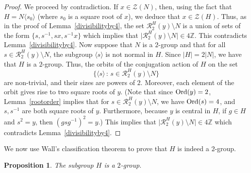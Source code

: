 \documentclass[12pt]{amsart}
\numberwithin{equation}{section}
\newcommand{\Ord}{{\rm Ord}}
\newcommand{\Z}{\mathbb Z}
\newtheorem{prop}[X]{Proposition}
\theoremstyle{definition}
\theoremstyle{remark}
\begin{document}
\begin{proof}
    We proceed by contradiction. If $x\in \mathcal{Z}(N)$, then, using the fact that $H=N\langle s_0\rangle$ (where $s_0$ is a square root of $x$), we deduce that $x\in \mathcal{Z}(H)$. Thus, as in the proof of Lemma~\ref{divisibilityby4}, the set $\mathcal{R}_2^H(y)\setminus N$ is a union of sets of the form $\{s,s^{-1},sx,s^{-1}x\}$ which implies that $\bigl| \mathcal{R}_2^H(y) \setminus N\bigr|\in4\Z$. This contradicts Lemma~\ref{divisibilityby4}. Now suppose that $N$ is a $2$-group and that for all $s\in \mathcal{R}_2^H(y) \setminus N$, the subgroup $\langle s \rangle$ is not normal in $H$. Since $|H|=2|N|$, we have that $H$ is a $2$-group. Thus, the orbits of the conjugation action of $H$ on the set \[\bigl\{ \langle s\rangle \, \colon\,  s\in \mathcal{R}_2^H(y) \setminus N \bigr\} \]
    are non-trivial, and their sizes are powers of $2$. Moreover, each element of the orbit gives rise to two square roots of $y$. (Note that since $\Ord(y)=2$, Lemma~\ref{rootorder} implies that for $s\in \mathcal{R}_2^H(y) \setminus N$, we have $\Ord(s)=4$, and $s,s^{-1}$ are both square roots of $y$. Furthermore, because $y$ is central in $H$, if $g\in H$ and $s^2=y$, then $(gsg^{-1})^2=y$.) This implies that $\bigl| \mathcal{R}_2^H(y) \setminus N\bigr|\in4\Z$ which contradicts Lemma~\ref{divisibilityby4}.
\end{proof}
We now use Wall's classification theorem to prove that $H$ is indeed a $2$-group.
\begin{prop}
    The subgroup $H$ is a $2$-group. 
\end{prop}
\end{document}
